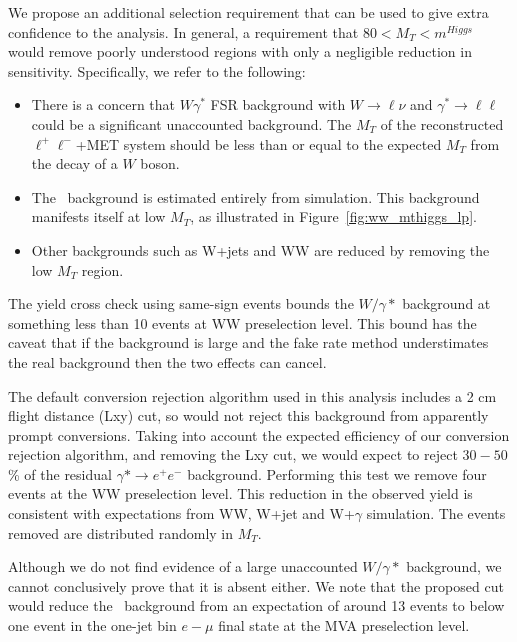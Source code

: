 We propose an additional selection requirement that can
be used to give extra confidence to the analysis. In general, a
requirement that $80 < M_T < m^{Higgs}$ would remove poorly understood
regions with only a negligible reduction in sensitivity.
Specifically, we refer to the following:

\begin{itemize}
    \item There is a concern that $W\gamma^*$ FSR background with
      $W\rightarrow \ell\nu$ and $\gamma^*\rightarrow\ell\ell$ could be
      a significant unaccounted background.  The $M_T$ of the
      reconstructed $\ell^{+}\ell^{-}$+MET system should be less than or
      equal to the expected $M_T$ from the decay of a $W$ boson.
    \item The \dytt~background is estimated entirely from simulation.
      This background manifests itself at low $M_T$, as illustrated in
      Figure~\ref{fig:ww_mthiggs_lp}.
    \item Other backgrounds such as W+jets and WW are reduced by
      removing the low $M_T$ region.
\end{itemize}

The yield cross check using same-sign events bounds the $W/\gamma*$ background
at something less than 10 events at WW preselection level.
This bound has the caveat that if the background is large and the
fake rate method understimates the real background then the two
effects can cancel.

The default conversion rejection algorithm used in this analysis
includes a 2 cm flight distance (Lxy) cut, so would not reject this background
from apparently prompt conversions.
Taking into account the expected efficiency of our conversion
rejection algorithm, and removing the Lxy cut,
we would expect to reject $30-50$\% of the residual
$\gamma*\rightarrow e^{+}e^{-}$ background.
Performing this test we remove four events at the WW preselection level.
This reduction in the observed yield is consistent with expectations
from WW, W+jet and W+$\gamma$ simulation.
The events removed are distributed randomly in $M_T$.

Although we do not find evidence of a large unaccounted $W/\gamma*$ background,
we cannot conclusively prove that it is absent either.
We note that the proposed cut would reduce the \dytt~background from an expectation
of around 13 events to below one event in the one-jet bin $e-\mu$ final state at
the MVA preselection level.

